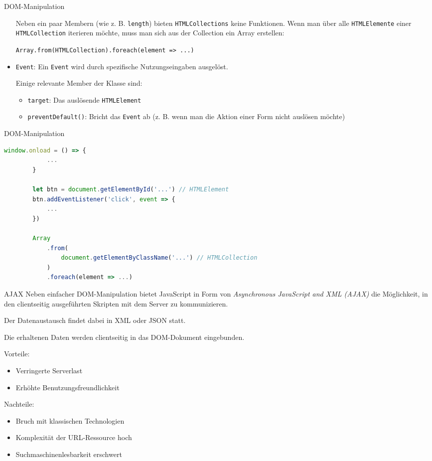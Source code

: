 \begin{defi}{DOM-Manipulation}
\begin{itemize}
              Neben ein paar Membern (wie z. B. \texttt{length}) bieten \texttt{HTMLCollections} keine Funktionen.
              Wenn man über alle \texttt{HTMLElemente} einer \texttt{HTMLCollection} iterieren möchte, muss man sich aus der Collection ein Array erstellen:

              \texttt{Array.from(HTMLCollection).foreach(element => {...})}
        \item \texttt{Event}: Ein \texttt{Event} wird durch spezifische Nutzungseingaben ausgelöst.

              Einige relevante Member der Klasse sind:
              \begin{itemize}
                  \item \texttt{target}: Das auslösende \texttt{HTMLElement}
                  \item \texttt{preventDefault()}: Bricht das \texttt{Event} ab (z. B. wenn man die Aktion einer Form nicht auslösen möchte)
              \end{itemize}
    \end{itemize}
\end{defi}

\begin{example}{DOM-Manipulation}
    \begin{lstlisting}[language=JavaScript]
        window.onload = () => {
            ...
        }

        let btn = document.getElementById('...') // HTMLElement
        btn.addEventListener('click', event => {
            ...
        })

        Array
            .from(
                document.getElementByClassName('...') // HTMLCollection
            )
            .foreach(element => ...)
    \end{lstlisting}
\end{example}

\begin{defi}{AJAX}
    Neben einfacher DOM-Manipulation bietet JavaScript in Form von \emph{Asynchronous JavaScript and XML (AJAX)} die Möglichkeit, in den clientseitig ausgeführten Skripten mit dem Server zu kommunizieren.

    Der Datenaustausch findet dabei in XML oder JSON statt.

    Die erhaltenen Daten werden clientseitig in das DOM-Dokument eingebunden.

    Vorteile:
    \begin{itemize}
        \item Verringerte Serverlast
        \item Erhöhte Benutzungsfreundlichkeit
    \end{itemize}

    Nachteile:
    \begin{itemize}
        \item Bruch mit klassischen Technologien
        \item Komplexität der URL-Ressource hoch
        \item Suchmaschinenlesbarkeit erschwert
    \end{itemize}
\end{defi}

